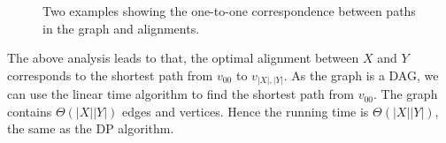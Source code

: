 \documentclass[letterpaper,11pt]{article}
\theoremstyle{mytheorem}
\begin{document}
\begin{figure}[h!]
\centering{}
\caption{Two examples showing the one-to-one correspondence between paths in the graph and alignments.}
\label{fig:graph2}
\end{figure}

The above analysis leads to that, the optimal alignment between $X$ and $Y$
corresponds to the shortest path from  $v_{00}$ to $v_{|X|,|Y|}$.
As the graph is a DAG, we can use the linear time algorithm to find the shortest path from $v_{00}$.
The graph contains $\Theta(|X||Y|)$ edges and vertices.
Hence the running time is $\Theta(|X||Y|)$,
the same as the DP algorithm.
\end{document}
